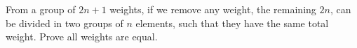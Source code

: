 From a group of $2n+1$ weights, if we remove any weight, the remaining $2n$, can be divided in two groups of $n$ elements, such that they have the same total weight. Prove all weights are equal.